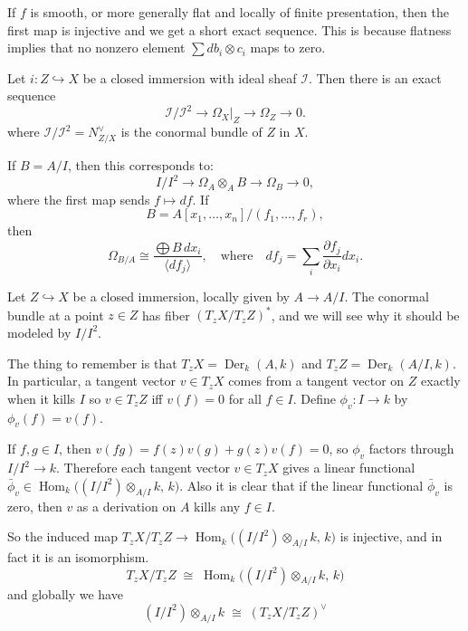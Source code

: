 \documentclass[12pt]{article}
\begin{document}
If $f$ is smooth, or more generally flat and locally of finite presentation, then the first map is injective and we get a short exact sequence. This is because
flatness implies that no nonzero element $\sum db_i \otimes c_i$ maps to zero.

\begin{proposition}
    Let $i: Z \hookrightarrow X$ be a closed immersion with ideal sheaf $\mathcal I$. Then there is an exact sequence
    \[
        \mathcal I/\mathcal I^2 \longrightarrow \Omega_X|_Z \longrightarrow \Omega_Z \longrightarrow 0.
    \] where $\mathcal I/\mathcal I^2 = N_{Z/X}^\vee$ is the conormal bundle of $Z$ in $X$.
\end{proposition}

If $B = A/I$, then this corresponds to:
\[
    I/I^2 \longrightarrow \Omega_A \otimes_A B \longrightarrow \Omega_B \longrightarrow 0,
\]
where the first map sends $f \mapsto df$. If
\[
    B = A[x_1,\dots,x_n]/(f_1,\dots,f_r),
\]
then
\[
    \Omega_{B/A} \cong \frac{\bigoplus B\,dx_i}{\langle df_j \rangle},
    \quad\text{where}\quad
    df_j = \sum_i \frac{\partial f_j}{\partial x_i} dx_i.
\]

\begin{remark}
    Let $Z \hookrightarrow X$ be a closed immersion, locally given by $A \to A/I$. The conormal bundle at a point $z\in Z$ has fiber $(T_z X / T_z Z)^*$, and we will see why it should be modeled by $I/I^2$.

    The thing to remember is that $T_zX=\operatorname{Der}_k(A,k)$ and $T_zZ=\operatorname{Der}_k(A/I,k)$. In particular, a tangent vector $v\in T_zX$ comes from a tangent vector on $Z$ exactly when it kills $I$ so $v\in T_zZ$ iff $v(f)=0$ for all $f\in I$. Define
    $\phi_v:I\to k$ by $\phi_v(f)=v(f)$.

    If $f,g\in I$, then
    $v(fg)=f(z)v(g)+g(z)v(f)=0$, so $\phi_v$ factors through
    $I/I^2 \to k$. Therefore each tangent vector $v\in T_zX$ gives a linear functional
    $\bar\phi_v \in \operatorname{Hom}_k\bigl((I/I^2)\otimes_{A/I} k,\,k\bigr)$. Also it is clear that if the linear functional $\bar\phi_v$ is zero, then $v$ as a derivation on $A$ kills any $f\in I$.

    So the induced map
    $T_zX/T_zZ \longrightarrow \operatorname{Hom}_k\bigl((I/I^2)\otimes_{A/I} k,\,k\bigr)$
    is injective, and in fact it is an isomorphism.
    \[T_zX/T_zZ \;\cong\; \operatorname{Hom}_k\bigl((I/I^2)\otimes_{A/I} k,\,k\bigr)\]
    and globally we have
    \[(I/I^2)\otimes_{A/I} k \;\cong\; (T_zX/T_zZ)^\vee\]
\end{remark}
\end{document}
